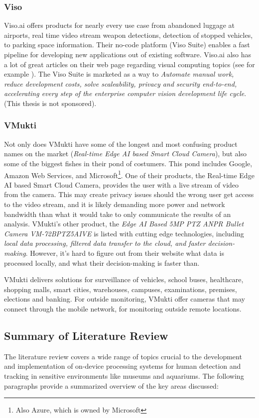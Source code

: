 \subsubsection{Viso}
\label{sec:viso}
Viso.ai offers products for nearly every use case from abandoned luggage at airports, real time video stream weapon detections, detection of stopped vehicles, to parking space information. Their no-code platform (Viso Suite) enables a fast pipeline for developing new applications out of existing software. Viso.ai also has a lot of great articles on their web page regarding visual computing topics (see for example \cite{bo2023yolov7_guide}). The Viso Suite is marketed as a way to \textit{Automate manual work, reduce development costs, solve scaleability, privacy and security end-to-end, accelerating every step of the enterprise computer vision development life cycle}. (This thesis is not sponsored).

\subsubsection{VMukti}
Not only does VMukti have some of the longest and most confusing product names on the market (\textit{Real-time Edge AI based Smart Cloud Camera}), but also some of the biggest fishes in their pond of costumers. This pond includes Google, Amazon Web Services, and Microsoft\footnote{Also Azure, which is owned by Microsoft}. One of their products, the Real-time Edge AI based Smart Cloud Camera, provides the user with a live stream of video from the camera. This may create privacy issues should the wrong user get access to the video stream, and it is likely demanding more power and network bandwidth than what it would take to only communicate the results of an analysis. VMukti's other product, the \textit{Edge AI Based 5MP PTZ ANPR Bullet Camera VM-72BPTZ5AIVE} is listed with cutting edge technologies, including \textit{local data processing, filtered data transfer to the cloud, and faster decision-making}. However, it's hard to figure out from their website what data is processed locally, and what their decision-making is faster than.

VMukti delivers solutions for surveillance of vehicles, school buses, healthcare, shopping malls, smart cities, warehouses, campuses, examinations, premises, elections and banking. For outside monitoring, VMukti offer cameras that may connect through the mobile network, for monitoring outside remote locations.

\newpage
\subsection{Summary of Literature Review}
The literature review covers a wide range of topics crucial to the development and implementation of on-device processing systems for human detection and tracking in sensitive environments like museums and aquariums. The following paragraphs provide a summarized overview of the key areas discussed:

